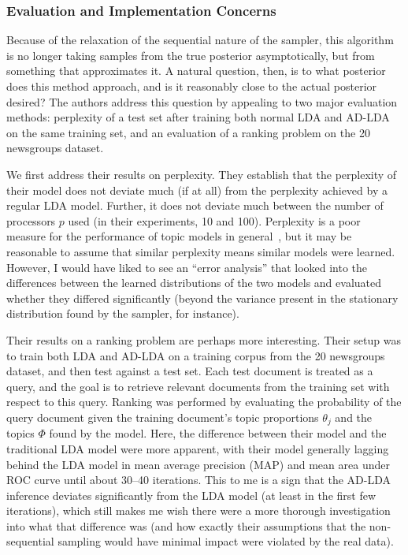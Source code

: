\documentclass[11pt]{article}
\begin{document}
\subsubsection{Evaluation and Implementation Concerns}

Because of the relaxation of the sequential nature of the sampler, this
algorithm is no longer taking samples from the true posterior
asymptotically, but from something that approximates it. A natural
question, then, is to what posterior does this method approach, and is it
reasonably close to the actual posterior desired? The authors address this
question by appealing to two major evaluation methods: perplexity of a test
set after training both normal LDA and AD-LDA on the same training set, and
an evaluation of a ranking problem on the 20 newsgroups dataset.

We first address their results on perplexity. They establish that the
perplexity of their model does not deviate much (if at all) from the
perplexity achieved by a regular LDA model. Further, it does not deviate
much between the number of processors $p$ used (in their experiments, 10
and 100). Perplexity is a poor measure for the performance of topic models
in general~\cite{Chang:2009:tealeaves}, but it may be reasonable to assume
that similar perplexity means similar models were learned. However, I would
have liked to see an ``error analysis'' that looked into the differences
between the learned distributions of the two models and evaluated whether
they differed significantly (beyond the variance present in the stationary
distribution found by the sampler, for instance).

Their results on a ranking problem are perhaps more interesting. Their
setup was to train both LDA and AD-LDA on a training corpus from the 20
newsgroups dataset, and then test against a test set. Each test document is
treated as a query, and the goal is to retrieve relevant documents from the
training set with respect to this query. Ranking was performed by
evaluating the probability of the query document given the training
document's topic proportions $\theta_j$ and the topics $\Phi$ found by the
model. Here, the difference between their model and the traditional LDA
model were more apparent, with their model generally lagging behind the LDA
model in mean average precision (MAP) and mean area under ROC curve until
about 30--40 iterations. This to me is a sign that the AD-LDA inference
deviates significantly from the LDA model (at least in the first few
iterations), which still makes me wish there were a more thorough
investigation into what that difference was (and how exactly their
assumptions that the non-sequential sampling would have minimal impact were
violated by the real data).
\end{document}
